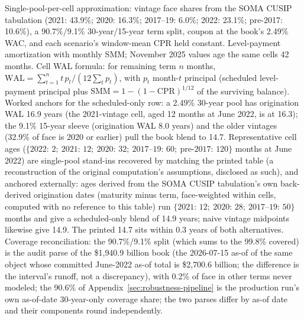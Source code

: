 \documentclass[12pt]{article}
\begin{document}
\begin{table}[H]
\begin{threeparttable}
\begin{tablenotes}[flushleft]
\item Single-pool-per-cell approximation: vintage face shares from the SOMA CUSIP tabulation (2021: 43.9\%; 2020: 16.3\%; 2017--19: 6.0\%; 2022: 23.1\%; pre-2017: 10.6\%), a 90.7\%/9.1\% 30-year/15-year term split, coupon at the book's 2.49\% WAC, and each scenario's window-mean CPR held constant. Level-payment amortization with monthly SMM; November 2025 values age the same cells 42 months. Cell WAL formula: for remaining term $n$ months, $\mathrm{WAL} = \sum_{t=1}^{n} t\, p_t / (12 \sum_{t} p_t)$, with $p_t$ month-$t$ principal (scheduled level-payment principal plus $\mathrm{SMM} = 1-(1-\mathrm{CPR})^{1/12}$ of the surviving balance). Worked anchors for the scheduled-only row: a 2.49\% 30-year pool has origination WAL 16.9 years (the 2021-vintage cell, aged 12 months at June 2022, is at 16.3); the 9.1\% 15-year sleeve (origination WAL 8.0 years) and the older vintages (32.9\% of face is 2020 or earlier) pull the book blend to 14.7. Representative cell ages ($\{2022{:}\,2;\ 2021{:}\,12;\ 2020{:}\,32;\ 2017\text{--}19{:}\,60;\ \text{pre-}2017{:}\,120\}$ months at June 2022) are single-pool stand-ins recovered by matching the printed table (a reconstruction of the original computation's assumptions, disclosed as such), and anchored externally: ages derived from the SOMA CUSIP tabulation's own back-derived origination dates (maturity minus term, face-weighted within cells, computed with no reference to this table) run $\{2021{:}\,12;\ 2020{:}\,28;\ 2017\text{--}19{:}\,50\}$ months and give a scheduled-only blend of 14.9 years; naive vintage midpoints likewise give 14.9. The printed 14.7 sits within 0.3 years of both alternatives. Coverage reconciliation: the 90.7\%/9.1\% split (which sums to the 99.8\% covered) is the audit parse of the \$1{,}940.9 billion book (the 2026-07-15 as-of of the same object whose committed June-2022 as-of total is \$2{,}700.6 billion; the difference is the interval's runoff, not a discrepancy), with 0.2\% of face in other terms never modeled; the 90.6\% of Appendix~\ref{sec:robustness-pipeline} is the production run's own as-of-date 30-year-only coverage share; the two parses differ by as-of date and their components round independently.

\end{tablenotes}
\end{threeparttable}
\end{table}
\end{document}
